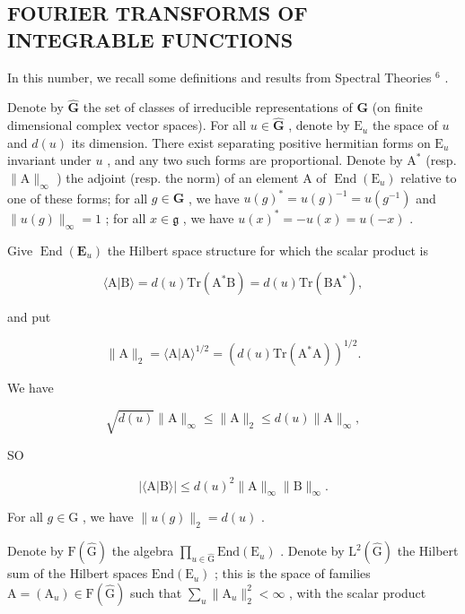 \subsection{FOURIER TRANSFORMS OF INTEGRABLE FUNCTIONS}

In this number, we recall some definitions and results from Spectral Theories \(^{6}\) .

Denote by \(\hat{\mathbf{G}}\) the set of classes of irreducible representations of \(\mathbf{G}\) (on finite dimensional complex vector spaces). For all \(u\in \hat{\mathbf{G}}\) , denote by \(\mathrm{E}_u\) the space of \(u\) and \(d(u)\) its dimension. There exist separating positive hermitian forms on \(\mathrm{E}_u\) invariant under \(u\) , and any two such forms are proportional. Denote by \(\mathrm{A}^*\) (resp. \(\| \mathrm{A}\|_{\infty}\) ) the adjoint (resp. the norm) of an element \(\mathrm{A}\) of \(\operatorname {End}(\mathrm{E}_u)\) relative to one of these forms; for all \(g\in \mathbf{G}\) , we have \(u(g)^{*} = u(g)^{-1} = u(g^{-1})\) and \(\| u(g)\|_{\infty} = 1\) ; for all \(x\in \mathfrak{g}\) , we have \(u(x)^{*} = -u(x) = u(-x)\) .

Give \(\operatorname{End}(\mathbf{E}_u)\) the Hilbert space structure for which the scalar product is

\[
\langle \mathrm{A} | \mathrm{B} \rangle = d (u) \mathrm{Tr} (\mathrm{A} ^ {*} \mathrm{B}) = d (u) \mathrm{Tr} (\mathrm{BA} ^ {*}),\tag{1}
\]

and put

\[
\| \mathrm{A} \| _ {2} = \langle \mathrm{A} | \mathrm{A} \rangle^ {1 / 2} = (d (u) \mathrm{Tr} (\mathrm{A} ^ {*} \mathrm{A})) ^ {1 / 2}.\tag{2}
\]

We have

\[
\sqrt {d (u)} \| \mathrm{A} \| _ {\infty} \leq \| \mathrm{A} \| _ {2} \leq d (u) \| \mathrm{A} \| _ {\infty},\tag{3}
\]

SO

\[
| \langle \mathrm{A} | \mathrm{B} \rangle | \leq d (u) ^ {2} \| \mathrm{A} \| _ {\infty} \| \mathrm{B} \| _ {\infty}.\tag{4}
\]

For all \(g \in \mathrm{G}\) , we have \(\| u(g) \|_2 = d(u)\) .

Denote by \(\mathrm{F}(\hat{\mathrm{G}})\) the algebra \(\prod_{u\in \hat{\mathrm{G}}}\mathrm{End}(\mathrm{E}_u)\) . Denote by \(\mathrm{L}^2 (\hat{\mathrm{G}})\) the Hilbert sum of the Hilbert spaces \(\mathrm{End}(\mathrm{E}_u)\) ; this is the space of families \(\mathrm{A} = (\mathrm{A}_u)\in \mathrm{F}(\hat{\mathrm{G}})\) such that \(\sum_{u}\| \mathrm{A}_{u}\|_{2}^{2} < \infty\) , with the scalar product

